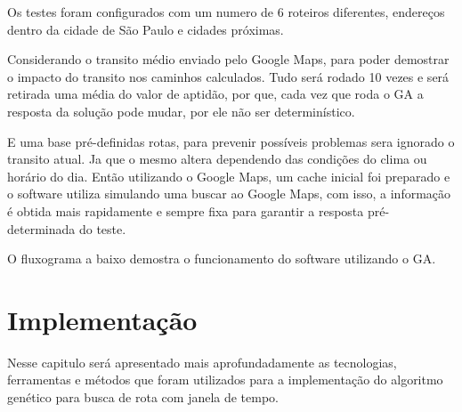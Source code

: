 Os testes foram configurados com um numero de 6 roteiros diferentes, endereços dentro da cidade de São Paulo e cidades próximas.

Considerando o transito médio enviado pelo Google Maps, para poder demostrar o impacto do transito nos caminhos calculados.
Tudo será rodado 10 vezes e será retirada uma média do valor de aptidão, por que, cada vez que roda o GA a resposta da solução pode mudar, por ele não ser determinístico.

E uma base pré-definidas rotas, para prevenir possíveis problemas sera ignorado o transito atual. Ja que o mesmo altera dependendo das condições do clima ou horário do dia. Então utilizando o Google Maps, um cache inicial foi preparado e o software utiliza simulando uma buscar ao Google Maps, com isso, a informação é obtida mais rapidamente e sempre fixa para garantir a resposta pré-determinada do teste.

O fluxograma a baixo demostra o funcionamento do software utilizando o GA.

\begin{center}
	\label{fig:FluxoGA}
\end{center}

\chapter{Implementação}
 
Nesse capitulo será apresentado mais aprofundadamente as tecnologias, ferramentas e métodos que foram utilizados para a implementação do algoritmo genético para busca de rota com janela de tempo.

